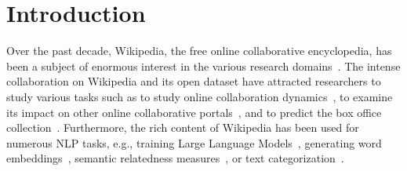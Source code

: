 \documentclass[acmsmall]{acmart}
\begin{document}




\maketitle

\section{Introduction}\label{Intro}
Over the past decade, Wikipedia, the free online collaborative encyclopedia, has been a subject of enormous interest in the various research domains~\cite{zhu2014impact,gabrilovich2006overcoming,mestyan2013early}. The intense collaboration on Wikipedia and its open dataset have attracted researchers to study various tasks such as to study online collaboration dynamics~\cite{kittur2008harnessing, gallus2020gender, zhang2017crowd, israeli2024test, jurgens2012temporal}, to examine its impact on other online collaborative portals~\cite{vincent2018examining, marashi2013impact, piccardi2021value}, and to predict the box office collection~\cite{mestyan2013early}. Furthermore, the rich content of Wikipedia has been used for numerous NLP tasks, e.g., training Large Language Models~\cite{roberts2020much, jang2022temporalwiki,su2024wikiformer}, generating word embeddings~\cite{mikolov2013efficient,bojanowski2017enriching, giesen2022leveraging, berenguer2024word}, semantic relatedness measures~\cite{gabrilovich2007computing}, or text categorization~\cite{gabrilovich2006overcoming}.
\end{document}
